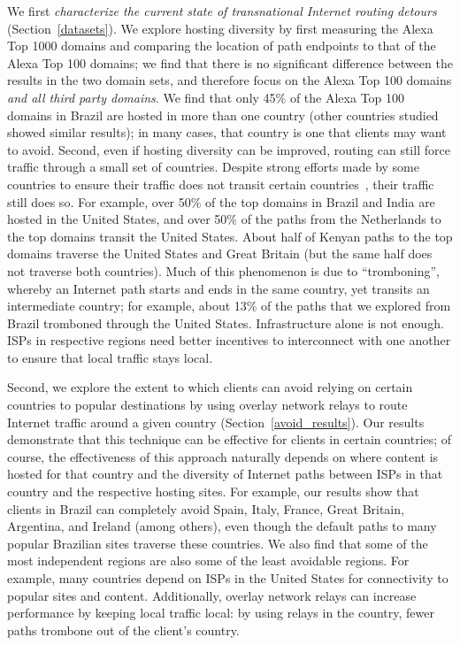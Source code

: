 We first {\em characterize the current state of transnational Internet
routing detours} (Section~\ref{datasets}).  We explore hosting diversity 
by first measuring the Alexa Top 1000 domains and comparing the location of 
path endpoints to that of the Alexa Top 100 domains; we find that there is no 
significant difference between the results in the two domain sets, and therefore 
focus on the Alexa Top 100 domains {\it and all third party domains}.  We find 
that only 45\% of the Alexa Top 100 domains in Brazil are hosted 
in more than one country (other countries studied showed similar results); in many cases,
that country is one that clients may want to avoid. Second, even if
hosting diversity can be improved, routing can still force traffic
through a small set of countries. Despite strong efforts made by some countries to ensure their
traffic does not transit certain countries~\cite{brazil_history,
  brazil_break_from_US, brazil_conference, brazil_conference2,
  brazil_human_rights}, their traffic still does so.  For example, over 50\% of the
top domains in Brazil and India are hosted in the United States, and
over 50\% of the paths from the Netherlands to the top domains transit
the United States.  About half of Kenyan paths to the top domains
traverse the United States and Great Britain (but the same half does not
traverse both countries).  Much of this phenomenon is due to
``tromboning'', whereby an Internet path starts and ends in the same country,
yet transits an intermediate country; for example, about 13\% of the
paths that we explored from Brazil tromboned through the United States.
Infrastructure alone is not enough. ISPs in respective regions
need better incentives to interconnect with one another to ensure
that local traffic stays local.

Second, we {explore the extent to which
clients can avoid relying on certain countries to popular destinations} by using overlay network relays to route 
Internet traffic around a given country (Section~\ref{avoid_results}).  Our results demonstrate that this technique can
be effective for clients in certain countries; of course, the effectiveness of
this approach naturally depends on where content is hosted for that country
and the diversity of Internet paths between ISPs in that country and the
respective hosting sites. For example, our results show that clients in Brazil
can completely avoid Spain, Italy, France, Great Britain, Argentina, and
Ireland (among others), even though the default paths to many popular
Brazilian sites traverse these countries. We also find that some of the most
independent regions are also some of the least avoidable regions.
For example, many countries depend on ISPs in the United States for connectivity to popular sites and content.
Additionally, overlay network relays can increase performance by keeping local
traffic local: by using relays in the country, fewer paths trombone
out of the client's country.

